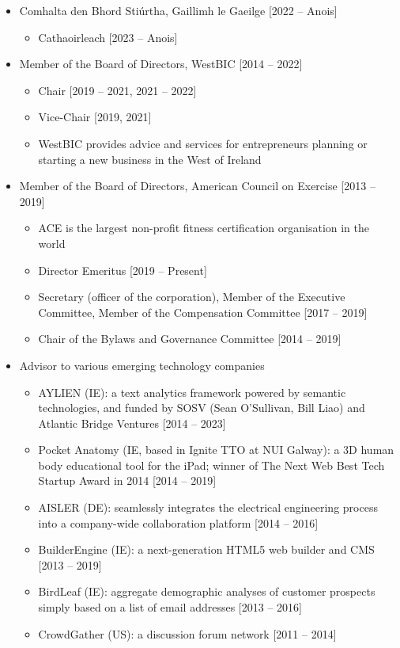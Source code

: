 \documentclass[10pt,a4paper]{res} %
\begin{document}
\begin{resume}
\begin{itemize} \itemsep -2pt
\item Comhalta den Bhord Sti\'{u}rtha, Gaillimh le Gaeilge [2022 -- Anois]
\begin{itemize} \itemsep -2pt
\item Cathaoirleach [2023 -- Anois]
\end{itemize}
\item Member of the Board of Directors, WestBIC [2014 -- 2022]
\begin{itemize} \itemsep -2pt
\item Chair [2019 -- 2021, 2021 -- 2022]
\item Vice-Chair [2019, 2021]
\item WestBIC provides advice and services for entrepreneurs planning or starting a new business in the West of Ireland
\end{itemize}
\item Member of the Board of Directors, American Council on Exercise [2013 -- 2019]
\begin{itemize} \itemsep -2pt
\item ACE is the largest non-profit fitness certification organisation in the world
\item Director Emeritus [2019 -- Present]
\item Secretary (officer of the corporation), Member of the Executive Committee, Member of the Compensation Committee [2017 -- 2019]
\item Chair of the Bylaws and Governance Committee [2014 -- 2019]
\end{itemize}
\item Advisor to various emerging technology companies
\begin{itemize} \itemsep -2pt
\item AYLIEN (IE): a text analytics framework powered by semantic technologies, and funded by SOSV (Sean O'Sullivan, Bill Liao) and Atlantic Bridge Ventures [2014 -- 2023]
\item Pocket Anatomy (IE, based in Ignite TTO at NUI Galway): a 3D human body educational tool for the iPad; winner of The Next Web Best Tech Startup Award in 2014 [2014 -- 2019]
\item AISLER (DE): seamlessly integrates the electrical engineering process into a company-wide collaboration platform [2014 -- 2016]
\item BuilderEngine (IE): a next-generation HTML5 web builder and CMS [2013 -- 2019]
\item BirdLeaf (IE): aggregate demographic analyses of customer prospects simply based on a list of email addresses [2013 -- 2016]
\item CrowdGather (US): a discussion forum network [2011 -- 2014]
\end{itemize}
\end{itemize}


\end{resume}
\end{document}
